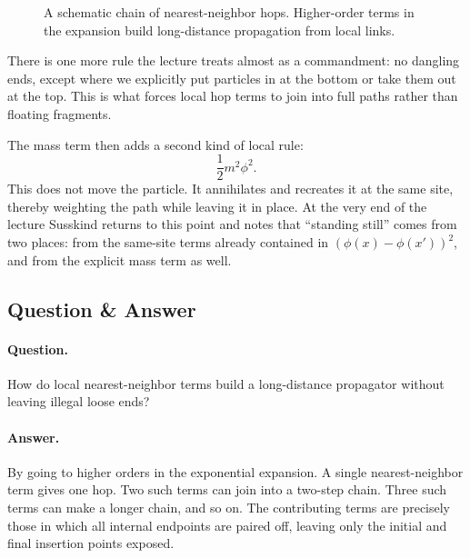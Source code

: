 \begin{figure}[h]
\centering
{}
\caption{A schematic chain of nearest-neighbor hops. Higher-order terms in the expansion build long-distance propagation from local links.}
\end{figure}

There is one more rule the lecture treats almost as a commandment: no dangling ends, except where we explicitly put particles in at the bottom or take them out at the top. This is what forces local hop terms to join into full paths rather than floating fragments.

The mass term then adds a second kind of local rule:
\begin{equation}
\frac{1}{2}m^2\phi^2.
\end{equation}
This does not move the particle. It annihilates and recreates it at the same site, thereby weighting the path while leaving it in place. At the very end of the lecture Susskind returns to this point and notes that ``standing still'' comes from two places: from the same-site terms already contained in \((\phi(x)-\phi(x'))^2\), and from the explicit mass term as well.

\subsection{Question \& Answer}

\paragraph{Question.} How do local nearest-neighbor terms build a long-distance propagator without leaving illegal loose ends?

\paragraph{Answer.} By going to higher orders in the exponential expansion. A single nearest-neighbor term gives one hop. Two such terms can join into a two-step chain. Three such terms can make a longer chain, and so on. The contributing terms are precisely those in which all internal endpoints are paired off, leaving only the initial and final insertion points exposed.

